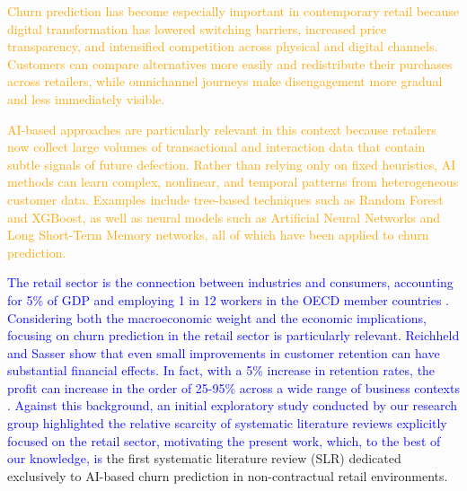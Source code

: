 \textcolor{orange}{Churn prediction has become especially important in contemporary retail because digital transformation has lowered switching barriers, increased price transparency, and intensified competition across physical and digital channels. Customers can compare alternatives more easily and redistribute their purchases across retailers, while omnichannel journeys make disengagement more gradual and less immediately visible.}

\textcolor{orange}{AI-based approaches are particularly relevant in this context because retailers now collect large volumes of transactional and interaction data that contain subtle signals of future defection. Rather than relying only on fixed heuristics, AI methods can learn complex, nonlinear, and temporal patterns from heterogeneous customer data. Examples include tree-based techniques such as Random Forest and XGBoost, as well as neural models such as Artificial Neural Networks and Long Short-Term Memory networks, all of which have been applied to churn prediction.}



\textcolor{blue}{The retail sector is the connection between industries and consumers, accounting for 5\% of GDP and employing 1 in 12 workers in the OECD member countries \cite{OECD2020}.  
Considering both the macroeconomic weight and the economic implications, focusing on churn prediction in the retail sector is particularly relevant.
Reichheld and Sasser show that even small improvements in customer retention can have substantial financial effects. In fact, with a 5\% increase in retention rates, the profit can increase in the order of 25-95\% across a wide range of business contexts \cite{Zero-defections-Reichheld}.}
\textcolor{blue}{Against this background, an initial exploratory study conducted by our research group highlighted the relative scarcity of systematic literature reviews explicitly focused on the retail sector, motivating the present work, which, to the best of our knowledge, is} the first systematic literature review (SLR) dedicated exclusively to AI-based churn prediction in non-contractual retail environments.

